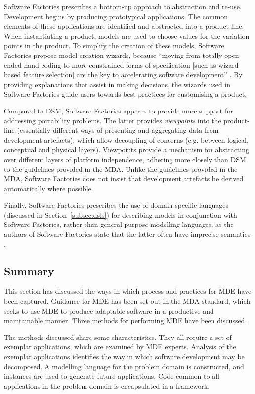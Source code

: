 Software Factories \cite{greenfield04software} prescribes a bottom-up approach to abstraction and re-use. Development begins by producing prototypical applications. The common elements of these applications are identified and abstracted into a product-line. When instantiating a product, models are used to choose values for the variation points in the product. To simplify the creation of these models, Software Factories propose model creation wizards, because ``moving from totally-open ended hand-coding to more constrained forms of specification [such as wizard-based feature selection] are the key to accelerating software development'' \cite[pg179]{greenfield04software}. By providing explanations that assist in making decisions, the wizards used in Software Factories guide users towards best practices for customising a product.

Compared to DSM, Software Factories appears to provide more support for addressing portability problems. The latter provides \textit{viewpoints} into the product-line (essentially different ways of presenting and aggregating data from development artefacts), which allow decoupling of concerns (e.g. between logical, conceptual and physical layers). Viewpoints provide a mechanism for abstracting over different layers of platform independence, adhering more closely than DSM to the guidelines provided in the MDA. Unlike the guidelines provided in the MDA, Software Factories does not insist that development artefacts be derived automatically where possible.

Finally, Software Factories prescribes the use of domain-specific languages (discussed in Section~\ref{subsec:dsls}) for describing models in conjunction with Software Factories, rather than general-purpose modelling languages, as the authors of Software Factories state that the latter often have imprecise semantics \cite{greenfield04software}.

\subsection{Summary}
This section has discussed the ways in which process and practices for MDE have been captured. Guidance for MDE has been set out in the MDA standard, which seeks to use MDE to produce adaptable software in a productive and maintainable manner. Three methods for performing MDE have been discussed.
 
The methods discussed share some characteristics. They all require a set of exemplar applications, which are examined by MDE experts. Analysis of the exemplar applications identifies the way in which software development may be decomposed. A modelling language for the problem domain is constructed, and instances are used to generate future applications. Code common to all applications in the problem domain is encapsulated in a framework.

